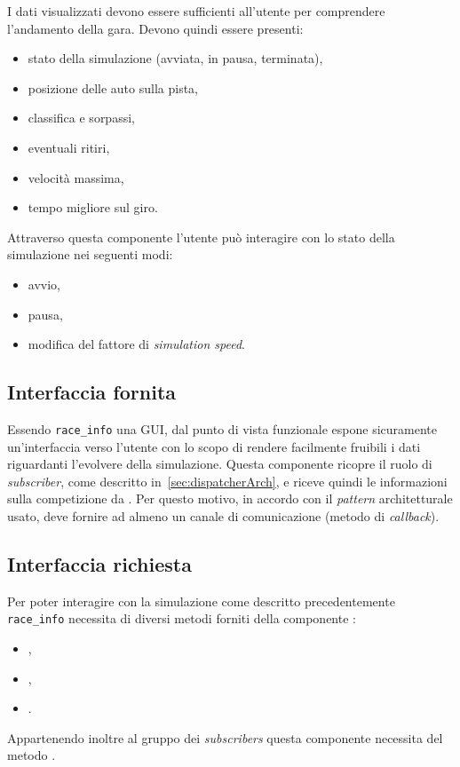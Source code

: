 I dati visualizzati devono essere sufficienti all'utente per comprendere l'andamento della gara. Devono quindi essere presenti:
\begin{itemize}
\item stato della simulazione (avviata, in pausa, terminata),
\item posizione delle auto sulla pista,
\item classifica e sorpassi,
\item eventuali ritiri,
\item velocità massima,
\item tempo migliore sul giro.
\end{itemize}
Attraverso questa componente l'utente può interagire con lo stato della simulazione nei seguenti modi:
\begin{itemize}
\item avvio,
\item pausa,
\item modifica del fattore di \textit{simulation speed}.
\end{itemize}

\subsection*{Interfaccia fornita}
Essendo \texttt{race\_info} una GUI, dal punto di vista funzionale espone sicuramente un'interfaccia verso l'utente con lo scopo di rendere facilmente fruibili i dati riguardanti l'evolvere della simulazione.
Questa componente ricopre il ruolo di \textit{subscriber}, come descritto in~\ref{sec:dispatcherArch}, e riceve quindi le informazioni sulla competizione da \evdisp{}. Per questo motivo, in accordo con il \textit{pattern} architetturale usato, deve fornire ad \evdisp{} almeno un canale di comunicazione (metodo di \textit{callback}).

\subsection*{Interfaccia richiesta}
Per poter interagire con la simulazione come descritto precedentemente \texttt{race\_info} necessita di diversi metodi forniti della componente \sched{}:
\begin{itemize}
\item {},
\item {},
\item {}.
\end{itemize}
Appartenendo inoltre al gruppo dei \textit{subscribers} questa componente necessita del metodo .

